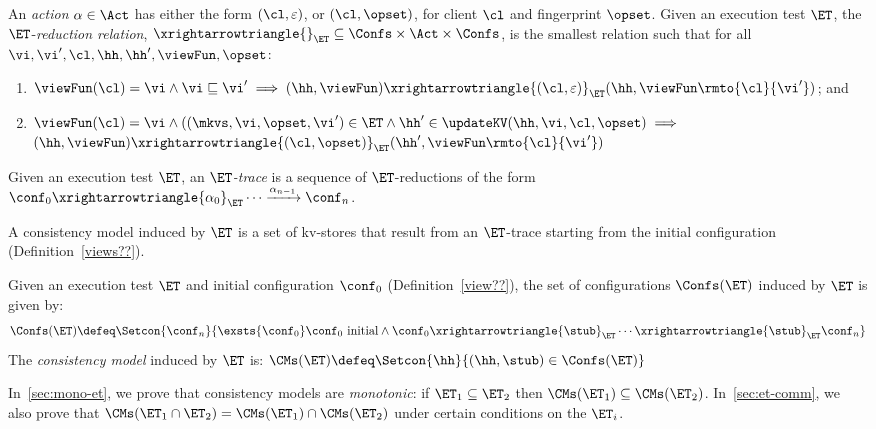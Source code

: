 \begin{definition}[$\ET$-trace]
\label{def:reduction}
An \emph{action} $\alpha \in \Act$ has either the form $(\cl, \varepsilon)$, 
or $(\cl, \opset)$, for client 
$\cl$ and fingerprint $\opset$. 
Given an execution test $\ET$, the $\ET$-\emph{reduction relation},
$\xrightarrowtriangle{}_{\ET} \subseteq \Confs \times \Act \times \Confs$, 
is the smallest relation such that for all $\vi, \vi', \cl, \hh, \hh', \viewFun, \opset$:
\begin{enumerate}
	\item 
    $
    \viewFun(\cl) = \vi 
    \wedge \vi \sqsubseteq \vi' 
    \implies (\hh, \viewFun) \xrightarrowtriangle{(\cl, \varepsilon)}_{\ET} 
    (\hh, \viewFun\rmto{\cl}{\vi'})$; and
	\item 
    $\viewFun(\cl) = \vi
        \wedge ((\mkvs, \vi,
\opset, \vi') \in \ET
        \wedge \hh' \in \updateKV(\hh, \vi, \cl, \opset) \implies
	$  \\
	\phantom{a} \hfill 
	$(\hh, \viewFun) \xrightarrowtriangle{(\cl, \opset)}_{\ET} (\hh', \viewFun\rmto{\cl}{\vi'})$
\end{enumerate}
Given an execution test $\ET$, an \emph{$\ET$-trace} is a sequence of $\ET$-reductions of the form $\conf_{0} \xrightarrowtriangle{\alpha_{0}}_{\ET} \cdots 
\xrightarrow{\alpha_{n-1}} \conf_{n}$.
\end{definition}





\noindent A consistency model induced by $\ET$ is a set of kv-stores
that  result from
an $\ET$-trace starting from the 
initial configuration (Definition~\ref{views??}). 

\begin{definition}
\label{def:cm}
Given an execution test $\ET$ and initial configuration $\conf_0$ (Definition~\ref{view??}),
the set of configurations $\Confs(\ET) $   induced by $\ET$ is   given by: 
\[
\Confs(\ET)\defeq \Setcon{ \conf_n}{ \exsts{\conf_0} \conf_0 \text{ 
    initial}  \wedge \conf_0 \xrightarrowtriangle{\stub}_{\ET} \cdots
  \xrightarrowtriangle{\stub}_{\ET} \conf_n }
\]
The \emph{consistency model} induced by $\ET$ is:
\( 
\CMs(\ET) \defeq \Setcon{ \hh }{ (\hh, \stub) \in \Confs(\ET) }
\)
\end{definition}

\noindent In~\cref{sec:mono-et}, we prove that consistency models are 
\emph{monotonic}: 
if  $\ET_1 \subseteq \ET_2$ then $\CMs(\ET_1) \subseteq \CMs(\ET_2)$.
In~\cref{sec:et-comm}, we also prove that  $\CMs(\ET_1 \cap \ET_2) = \CMs(\ET_1) \cap
\CMs(\ET_2)$ under certain conditions on the $\ET_i$.


